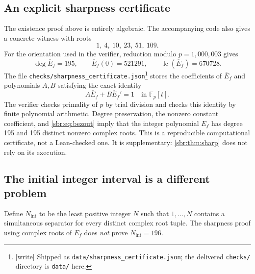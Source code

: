 \documentclass[11pt,letterpaper]{article}
\numberwithin{equation}{section}
\theoremstyle{definition}
\theoremstyle{remark}
\DeclareMathOperator{\lc}{lc}
\newcommand{\src}[1]{\texttt{\nolinkurl{#1}}}
\begin{document}
\subsection{An explicit sharpness certificate}

The existence proof above is entirely algebraic. The accompanying code also
gives a concrete witness with roots
\begin{equation}
 1,\ 4,\ 10,\ 23,\ 51,\ 109.
 \label{sbr:eq:sharp-roots}
\end{equation}
For the orientation used in the verifier, reduction modulo
$p=1{,}000{,}003$ gives
\begin{equation}
 \deg\overline E_f=195,\qquad
 \overline E_f(0)=521291,\qquad
 \lc(\overline E_f)=670728.
\end{equation}
The file \src{checks/sharpness_certificate.json}\footnote{[write] Shipped
as \src{data/sharpness_certificate.json}; the delivered \src{checks/}
directory is \src{data/} here.} stores the coefficients of
$\overline E_f$ and polynomials $A,B$ satisfying the exact identity
\begin{equation}
 A\overline E_f+B\overline E_f'=1\quad\text{in }\mathbb F_p[t].
 \label{sbr:eq:bezout}
\end{equation}
The verifier checks primality of $p$ by trial division and checks this
identity by finite polynomial arithmetic. Degree preservation, the nonzero
constant coefficient, and \cref{sbr:eq:bezout} imply that the integer
polynomial $E_f$ has degree 195 and 195 distinct nonzero complex roots.
This is a reproducible computational certificate, not a Lean-checked one.
It is supplementary: \cref{sbr:thm:sharp} does not rely on its execution.

\subsection{The initial integer interval is a different problem}

Define $N_{\mathrm{int}}$ to be the least positive integer $N$ such that
$1,\ldots,N$ contains a simultaneous separator for every distinct complex
root tuple. The sharpness proof using complex roots of $E_f$ does
\emph{not} prove $N_{\mathrm{int}}=196$.
\end{document}
